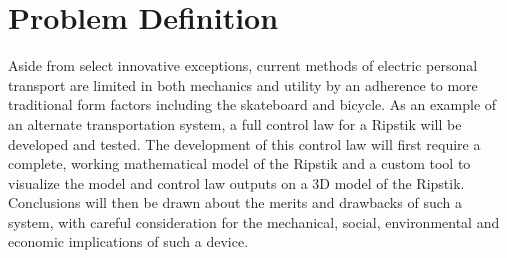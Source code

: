 \section{Problem Definition}

Aside from select innovative exceptions, current methods of electric personal transport are limited in both mechanics and utility by an adherence to more traditional form factors including the skateboard and bicycle. As an example of an alternate transportation system, a full control law for a Ripstik will be developed and tested. The development of this control law will first require a complete, working mathematical model of the Ripstik and a custom tool to visualize the model and control law outputs on a 3D model of the Ripstik. Conclusions will then be drawn about the merits and drawbacks of such a system, with careful consideration for the mechanical, social, environmental and economic implications of such a device.